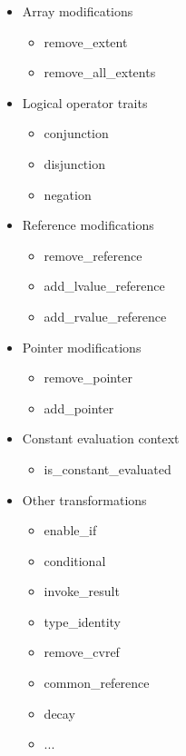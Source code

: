 \begin{itemize}
\item
Array modifications

\begin{itemize}
\item
remove\_extent

\item
remove\_all\_extents
\end{itemize}

\item
Logical operator traits

\begin{itemize}
\item
conjunction

\item
disjunction

\item
negation
\end{itemize}

\item
Reference modifications

\begin{itemize}
\item
remove\_reference

\item
add\_lvalue\_reference

\item
add\_rvalue\_reference
\end{itemize}

\item
Pointer modifications

\begin{itemize}
\item
remove\_pointer

\item
add\_pointer
\end{itemize}

\item
Constant evaluation context

\begin{itemize}
\item
is\_constant\_evaluated
\end{itemize}

\item
Other transformations

\begin{itemize}
\item
enable\_if

\item
conditional

\item
invoke\_result

\item
type\_identity

\item
remove\_cvref

\item
common\_reference

\item
decay

\item
...
\end{itemize}
\end{itemize}

